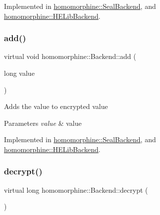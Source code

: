 Implemented in \mbox{\hyperlink{classhomomorphine_1_1_seal_backend_ae868a22dda1eed2246c59aa831707bf1}{homomorphine\+::\+Seal\+Backend}}, and \mbox{\hyperlink{classhomomorphine_1_1_h_e_lib_backend_a1e3c4745d7efdaac1f75c5a7fbfc3707}{homomorphine\+::\+H\+E\+Lib\+Backend}}.

\mbox{\label{classhomomorphine_1_1_backend_a7175812578b22d9ff19d49760cb04b26}} 
\subsubsection{\texorpdfstring{add()}{add()}\hspace{0.1cm}{\footnotesize\ttfamily [2/2]}}
{\footnotesize\ttfamily virtual void homomorphine\+::\+Backend\+::add (\begin{DoxyParamCaption}\item[{long}]{value }\end{DoxyParamCaption})\hspace{0.3cm}{\ttfamily [pure virtual]}}

Adds the value to encrypted value


\begin{DoxyParams}{Parameters}
{\em value} & value \\
\hline
\end{DoxyParams}


Implemented in \mbox{\hyperlink{classhomomorphine_1_1_seal_backend_acbff51d94165f4e578cafaeb965e4367}{homomorphine\+::\+Seal\+Backend}}, and \mbox{\hyperlink{classhomomorphine_1_1_h_e_lib_backend_a6cc00dcfc209206e67c7237934cb8d82}{homomorphine\+::\+H\+E\+Lib\+Backend}}.

\mbox{\label{classhomomorphine_1_1_backend_ae5c5de7bddabef1bd9a935be5bbd9646}} 
\subsubsection{\texorpdfstring{decrypt()}{decrypt()}}
{\footnotesize\ttfamily virtual long homomorphine\+::\+Backend\+::decrypt (\begin{DoxyParamCaption}{ }\end{DoxyParamCaption})\hspace{0.3cm}{\ttfamily [pure virtual]}}

